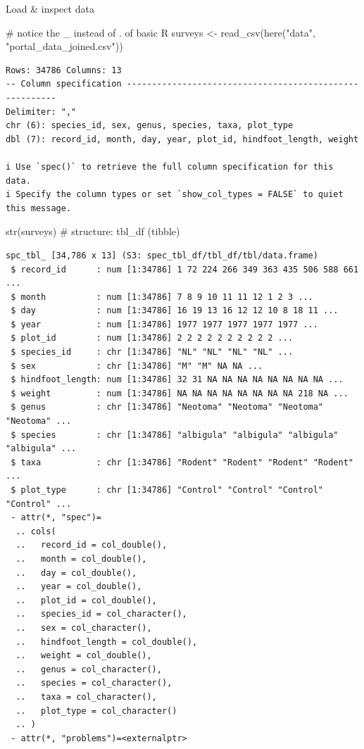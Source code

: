 \documentclass[
  letterpaper,
  DIV=11,
  numbers=noendperiod]{scrreprt}
\newenvironment{Shaded}{\begin{snugshade}}{\end{snugshade}}
\newcommand{\CommentTok}[1]{\textcolor[rgb]{0.37,0.37,0.37}{#1}}
\newcommand{\FunctionTok}[1]{\textcolor[rgb]{0.28,0.35,0.67}{#1}}
\newcommand{\NormalTok}[1]{\textcolor[rgb]{0.00,0.23,0.31}{#1}}
\newcommand{\OtherTok}[1]{\textcolor[rgb]{0.00,0.23,0.31}{#1}}
\newcommand{\StringTok}[1]{\textcolor[rgb]{0.13,0.47,0.30}{#1}}
\begin{document}
Load \& inspect data

\begin{Shaded}
\begin{Highlighting}[]
\CommentTok{\# notice the \textquotesingle{}\_\textquotesingle{} instead of \textquotesingle{}.\textquotesingle{} of basic R}
\NormalTok{surveys }\OtherTok{\textless{}{-}} \FunctionTok{read\_csv}\NormalTok{(}\FunctionTok{here}\NormalTok{(}\StringTok{"data"}\NormalTok{, }\StringTok{"portal\_data\_joined.csv"}\NormalTok{))}
\end{Highlighting}
\end{Shaded}

\begin{verbatim}
Rows: 34786 Columns: 13
-- Column specification --------------------------------------------------------
Delimiter: ","
chr (6): species_id, sex, genus, species, taxa, plot_type
dbl (7): record_id, month, day, year, plot_id, hindfoot_length, weight

i Use `spec()` to retrieve the full column specification for this data.
i Specify the column types or set `show_col_types = FALSE` to quiet this message.
\end{verbatim}

\begin{Shaded}
\begin{Highlighting}[]
\FunctionTok{str}\NormalTok{(surveys) }\CommentTok{\# structure: tbl\_df (tibble)}
\end{Highlighting}
\end{Shaded}

\begin{verbatim}
spc_tbl_ [34,786 x 13] (S3: spec_tbl_df/tbl_df/tbl/data.frame)
 $ record_id      : num [1:34786] 1 72 224 266 349 363 435 506 588 661 ...
 $ month          : num [1:34786] 7 8 9 10 11 11 12 1 2 3 ...
 $ day            : num [1:34786] 16 19 13 16 12 12 10 8 18 11 ...
 $ year           : num [1:34786] 1977 1977 1977 1977 1977 ...
 $ plot_id        : num [1:34786] 2 2 2 2 2 2 2 2 2 2 ...
 $ species_id     : chr [1:34786] "NL" "NL" "NL" "NL" ...
 $ sex            : chr [1:34786] "M" "M" NA NA ...
 $ hindfoot_length: num [1:34786] 32 31 NA NA NA NA NA NA NA NA ...
 $ weight         : num [1:34786] NA NA NA NA NA NA NA NA 218 NA ...
 $ genus          : chr [1:34786] "Neotoma" "Neotoma" "Neotoma" "Neotoma" ...
 $ species        : chr [1:34786] "albigula" "albigula" "albigula" "albigula" ...
 $ taxa           : chr [1:34786] "Rodent" "Rodent" "Rodent" "Rodent" ...
 $ plot_type      : chr [1:34786] "Control" "Control" "Control" "Control" ...
 - attr(*, "spec")=
  .. cols(
  ..   record_id = col_double(),
  ..   month = col_double(),
  ..   day = col_double(),
  ..   year = col_double(),
  ..   plot_id = col_double(),
  ..   species_id = col_character(),
  ..   sex = col_character(),
  ..   hindfoot_length = col_double(),
  ..   weight = col_double(),
  ..   genus = col_character(),
  ..   species = col_character(),
  ..   taxa = col_character(),
  ..   plot_type = col_character()
  .. )
 - attr(*, "problems")=<externalptr> 
\end{verbatim}
\end{document}
